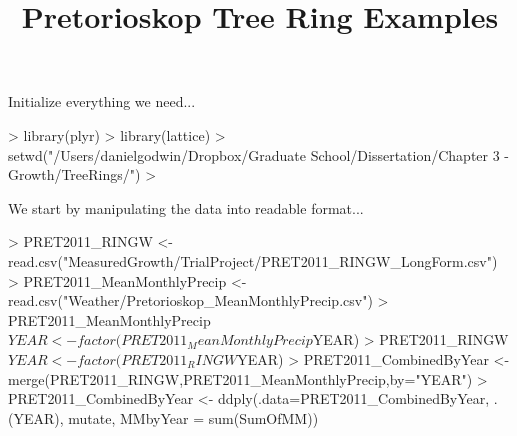 \documentclass{article}
\title{Pretorioskop Tree Ring Examples}
\begin{document}
\maketitle


Initialize everything we need...
\begin{Schunk}
\begin{Sinput}
> library(plyr)
> library(lattice)
> setwd("/Users/danielgodwin/Dropbox/Graduate School/Dissertation/Chapter 3 - Growth/TreeRings/")
> 
\end{Sinput}
\end{Schunk}

We start by manipulating the data into readable format...
\begin{Schunk}
\begin{Sinput}
> PRET2011_RINGW <- read.csv("MeasuredGrowth/TrialProject/PRET2011_RINGW_LongForm.csv")
> PRET2011_MeanMonthlyPrecip <- read.csv("Weather/Pretorioskop_MeanMonthlyPrecip.csv")
> PRET2011_MeanMonthlyPrecip$YEAR <- factor(PRET2011_MeanMonthlyPrecip$YEAR)
> PRET2011_RINGW$YEAR <- factor(PRET2011_RINGW$YEAR)
> PRET2011_CombinedByYear <- merge(PRET2011_RINGW,PRET2011_MeanMonthlyPrecip,by="YEAR")
> PRET2011_CombinedByYear <- ddply(.data=PRET2011_CombinedByYear, .(YEAR), mutate, MMbyYear = sum(SumOfMM))
\end{Sinput}
\end{Schunk}
\end{document}
